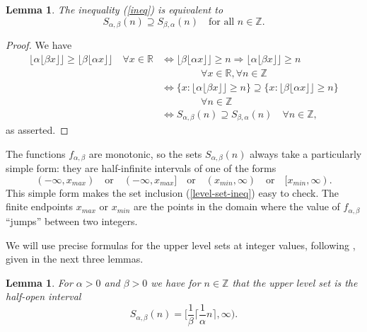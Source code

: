 \documentclass[12pt,letterpaper, reqno]{amsart}
\newtheorem{lem}[thm]{Lemma}
\theoremstyle{definition}
\theoremstyle{remark}
\newcommand{\RR}{\ensuremath{\mathbb{R}}}
\newcommand{\ZZ}{\ensuremath{\mathbb{Z}}}
\newcommand{\floor}[1]{\lfloor{#1}\rfloor}
\newcommand{\ceil}[1]{\lceil{#1}\rceil}
\begin{document}

\begin{lem}\label{lem:21}
The inequality (\ref{ineq}) is equivalent to
\begin{equation}\label{level-set-ineq} S_{\alpha,\beta}(n) \supseteq S_{\beta,\alpha}(n) \quad\text{for all }n\in\ZZ.\end{equation}
\end{lem}
\begin{proof}
We have
\begin{align*}
\floor{\alpha\floor{\beta x}} \geq \floor{\beta\floor{\alpha x}} \quad\forall x\in\RR 
&\Leftrightarrow \floor{\beta\floor{\alpha x}}\geq n \Rightarrow \floor{\alpha\floor{\beta x}}\geq n\\
& \qquad\qquad \forall x\in\RR, \forall n\in\ZZ\\
&\Leftrightarrow \{x:\floor{\alpha\floor{\beta x}}\geq n\} \supseteq \{x:\floor{\beta\floor{\alpha x}}\geq n \}\\
& \qquad\qquad\forall n\in\ZZ\\
&\Leftrightarrow S_{\alpha,\beta}(n) \supseteq S_{\beta,\alpha}(n) \quad\forall n\in\ZZ,
\end{align*}
as asserted.
\end{proof}
The functions $f_{\alpha,\beta}$ are  monotonic, so the sets $S_{\alpha,\beta}(n)$ always take a particularly simple form: they are half-infinite intervals of one of the forms
\[ (-\infty, x_{max})\quad\text{or}\quad (-\infty, x_{max}]\quad\text{or}\quad (x_{min},\infty) \quad\text{or}\quad [x_{min},\infty).\]
This simple form makes the set inclusion (\ref{level-set-ineq}) easy to check.
The finite endpoints $x_{max}$ or $x_{min}$ are the points in the domain where the value of $f_{\alpha,\beta}$ ``jumps'' between two integers. 

We  will use precise formulas for the upper level sets at integer values, following \cite{LMR16},
given in the next three lemmas.  


\begin{lem}\label{lem:22}
For $\alpha>0$ and $ \beta >0$ we have for  $n \in \ZZ$ that
the upper level set is the half-open interval
$$
S_{\alpha, \beta}(n) =\bigg[ \frac1\beta \ceil{\frac{1}{\alpha} n}, \infty \bigg).
$$ 
\end{lem}
\end{document}
